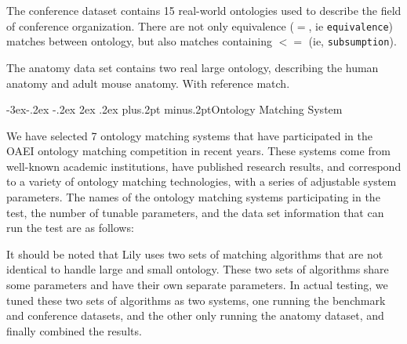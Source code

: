 \documentclass[twoside]{article}
\makeatletter
\def\subsection{\@startsection{subsection}{2}{\z@}%
 {-3ex\@plus -.2ex \@minus -.2ex}%
 {2ex \@plus.2ex}%
{\normalfont\normalsize\protect\baselineskip=12.5pt plus.2pt minus.2pt\bfseries}}
\makeatother
\begin{document}
\begin{multicols}{2}
The conference dataset contains 15 real-world ontologies used to describe the field of conference organization. There are not only equivalence ($=$, ie \texttt{equivalence}) matches between ontology, but also matches containing $<=$ (ie, \texttt{subsumption}).

The anatomy data set contains two real large ontology, describing the human anatomy and adult mouse anatomy. With reference match.

\subsection{Ontology Matching System}

We have selected 7 ontology matching systems that have participated in the OAEI ontology matching competition in recent years. 
These systems come from well-known academic institutions, have published research results, and correspond to a variety of ontology matching technologies, with a series of adjustable system parameters. 
The names of the ontology matching systems participating in the test, the number of tunable parameters, and the data set information that can run the test are as follows:


It should be noted that Lily uses two sets of matching algorithms that are not identical to handle large and small ontology. These two sets of algorithms share some parameters and have their own separate parameters. 
In actual testing, we tuned these two sets of algorithms as two systems, one running the benchmark and conference datasets, and the other only running the anatomy dataset, and finally combined the results.


\end{multicols}
\end{document}
